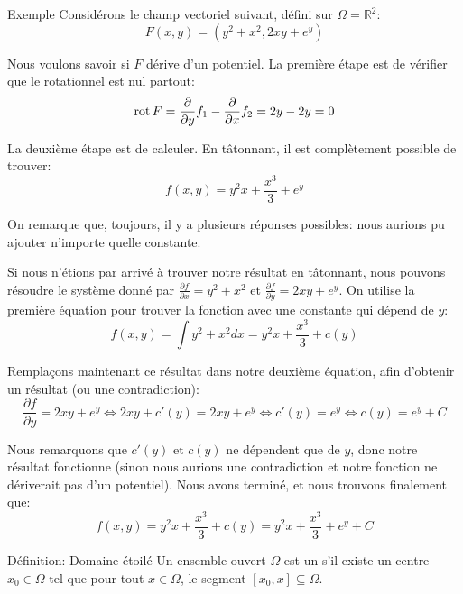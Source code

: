 \documentclass[a4paper]{article}
\begin{document}
\begin{parag}{Exemple}
    Considérons le champ vectoriel suivant, défini sur $\Omega = \mathbb{R}^2$: 
    \[F\left(x, y\right) = \left(y^2 + x^2, 2xy + e^y\right)\]
    
    Nous voulons savoir si $F$ dérive d'un potentiel. La première étape est de vérifier que le rotationnel est nul partout:
    \[\operatorname{rot} F = \frac{\partial }{\partial y} f_1 - \frac{\partial }{\partial x} f_2 = 2y  - 2y = 0\]
    
    La deuxième étape est de calculer. En tâtonnant, il est complètement possible de trouver:
    \[f\left(x, y\right) = y^2x + \frac{x^3}{3} + e^y\]
    
    On remarque que, toujours, il y a plusieurs réponses possibles: nous aurions pu ajouter n'importe quelle constante.

    Si nous n'étions par arrivé à trouver notre résultat en tâtonnant, nous pouvons résoudre le système donné par $\frac{\partial f}{\partial x} = y^2 + x^2$ et $\frac{\partial f}{\partial y} = 2xy + e^y$. On utilise la première équation pour trouver la fonction avec une constante qui dépend de $y$:
    \[f\left(x, y\right) = \int y^2 + x^2 dx = y^2 x + \frac{x^3}{3} + c\left(y\right)\]
    
    Remplaçons maintenant ce résultat dans notre deuxième équation, afin d'obtenir un résultat (ou une contradiction): 
    \[\frac{\partial f}{\partial y} = 2xy + e^y \iff 2xy + c'\left(y\right) = 2xy + e^y \iff c'\left(y\right) = e^y \iff c\left(y\right) = e^y + C\]
    
    Nous remarquons que $c'\left(y\right)$ et $c\left(y\right)$ ne dépendent que de $y$, donc notre résultat fonctionne (sinon nous aurions une contradiction et notre fonction ne dériverait pas d'un potentiel). Nous avons terminé, et nous trouvons finalement que: 
    \[f\left(x, y\right) = y^2 x + \frac{x^3}{3} + c\left(y\right) = y^2 x + \frac{x^3}{3} + e^y + C\]

\end{parag}

\begin{parag}{Définition: Domaine étoilé}
    Un ensemble ouvert $\Omega$ est un  s'il existe un centre $x_0 \in \Omega$ tel que pour tout $x \in \Omega$, le segment $\left[x_0, x\right] \subseteq \Omega$.
    
\end{parag}
\end{document}
